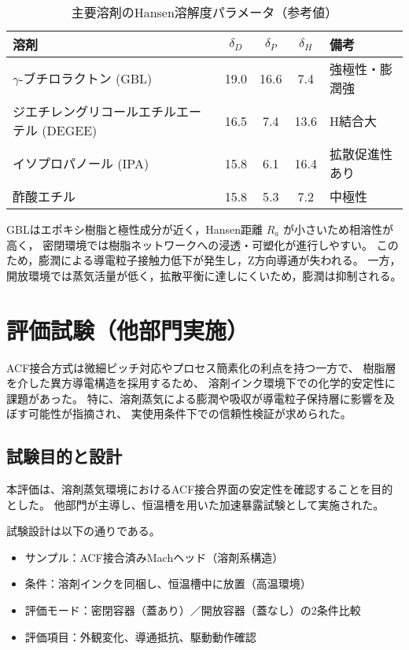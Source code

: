 \documentclass[conference]{IEEEtran}
\begin{document}
\begin{table}[h]
\centering
\caption{主要溶剤のHansen溶解度パラメータ（参考値）}
\label{tab:HSP}
\begin{tabularx}{\columnwidth}{@{}l c c c l@{}}
\toprule
溶剤 & $\delta_D$ & $\delta_P$ & $\delta_H$ & 備考 \\
\midrule
$\gamma$-ブチロラクトン (GBL) & 19.0 & 16.6 & 7.4 & 強極性・膨潤強 \\
ジエチレングリコールエチルエーテル (DEGEE) & 16.5 & 7.4 & 13.6 & H結合大 \\
イソプロパノール (IPA) & 15.8 & 6.1 & 16.4 & 拡散促進性あり \\
酢酸エチル & 15.8 & 5.3 & 7.2 & 中極性 \\
\bottomrule
\end{tabularx}
\end{table}

GBLはエポキシ樹脂と極性成分が近く，Hansen距離 $R_a$ が小さいため相溶性が高く，
密閉環境では樹脂ネットワークへの浸透・可塑化が進行しやすい。
このため，膨潤による導電粒子接触力低下が発生し，Z方向導通が失われる。
一方，開放環境では蒸気活量が低く，拡散平衡に達しにくいため，膨潤は抑制される。

\section{評価試験（他部門実施）}

ACF接合方式は微細ピッチ対応やプロセス簡素化の利点を持つ一方で、  
樹脂層を介した異方導電構造を採用するため、  
溶剤インク環境下での化学的安定性に課題があった。  
特に、溶剤蒸気による膨潤や吸収が導電粒子保持層に影響を及ぼす可能性が指摘され、  
実使用条件下での信頼性検証が求められた。

\subsection{試験目的と設計}
本評価は、溶剤蒸気環境におけるACF接合界面の安定性を確認することを目的とした。  
他部門が主導し、恒温槽を用いた加速暴露試験として実施された。  

試験設計は以下の通りである。

\begin{itemize}
  \item サンプル：ACF接合済みMachヘッド（溶剤系構造）
  \item 条件：溶剤インクを同梱し、恒温槽中に放置（高温環境）
  \item 評価モード：密閉容器（蓋あり）／開放容器（蓋なし）の2条件比較
  \item 評価項目：外観変化、導通抵抗、駆動動作確認
\end{itemize}
\end{document}
